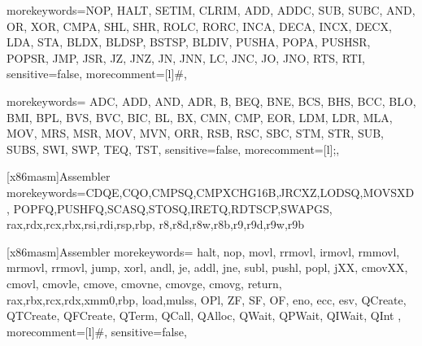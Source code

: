 \makeatother

{morekeywords={NOP, HALT, SETIM, CLRIM, ADD, ADDC, SUB, SUBC, AND, OR, XOR, CMPA,
							SHL, SHR, ROLC, RORC, INCA, DECA, INCX, DECX, LDA, STA,
							BLDX, BLDSP, BSTSP, BLDIV, PUSHA, POPA, PUSHSR, POPSR, JMP, JSR,
							JZ, JNZ, JN, JNN, LC, JNC, JO, JNO, RTS, RTI},
sensitive=false,
morecomment=[l]{\#},
}

{morekeywords={
	ADC, ADD, AND, ADR,
							B, BEQ, BNE, BCS, BHS, BCC, BLO, BMI, BPL, BVS, BVC,
			BIC, BL, BX, CMN, CMP, EOR, LDM, LDR, 
								MLA, MOV, MRS, MSR, MOV, MVN, ORR, RSB, RSC, SBC,
								STM, STR, SUB, SUBS,
								SWI, SWP, TEQ, TST},
sensitive=false,
morecomment=[l]{;},
}

   [x86masm]{Assembler} %
   {morekeywords={CDQE,CQO,CMPSQ,CMPXCHG16B,JRCXZ,LODSQ,MOVSXD, %
                  POPFQ,PUSHFQ,SCASQ,STOSQ,IRETQ,RDTSCP,SWAPGS, %
                  rax,rdx,rcx,rbx,rsi,rdi,rsp,rbp, %
                  r8,r8d,r8w,r8b,r9,r9d,r9w,r9b}} %


   [x86masm]{Assembler} %
   {morekeywords={ halt, nop, movl, rrmovl, irmovl, rmmovl, mrmovl, rrmovl, jump,%
                  xorl, andl, je, addl, jne, subl, pushl, popl, jXX,%
                  cmovXX, cmovl, cmovle, cmove, cmovne, cmovge, cmovg, return,%
                   rax,rbx,rcx,rdx,xmm0,rbp, load,mulss,%
                   OPl, ZF, SF, OF,%
                   eno, ecc, esv,
                   QCreate, QTCreate, QFCreate, QTerm, QCall, QAlloc,
                   QWait, QPWait, QIWait, QInt
                  },
      morecomment=[l]{\#},
      sensitive=false,
     } %


